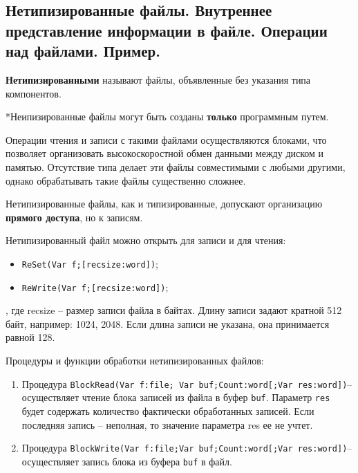
\newpage\subsection{Нетипизированные  файлы.  Внутреннее  представление  информации  в  файле.  Операции 
над файлами. Пример. }

\begin{myquote}
            
\end{myquote}

\noindent
{\bf{Нетипизированными}} называют файлы, объявленные без указания типа компонентов.

\noindent
*Неипизированные файлы могут быть созданы {\bf только} программным путем.

Операции чтения и записи с такими файлами осуществляются блоками, что позволяет организовать высокоскоростной обмен данными между диском и памятью. Отсутствие типа делает эти файлы совместимыми с любыми другими, однако обрабатывать такие файлы существенно сложнее.


Нетипизированные файлы, как и типизированные, допускают организацию {\bf{прямого доступа}}, но к записям.

\noindent
Нетипизированный файл можно открыть для записи и для чтения:
\begin{itemize}
         \item \texttt{ReSet(Var f;[recsize:word])};
         \item \texttt{ReWrite(Var f;[recsize:word])};
\end{itemize}

\noindent
, где recsize – размер записи файла в байтах. Длину записи задают кратной 512 байт, например:  1024, 2048. Если длина записи не указана, она принимается равной 128.

\noindent
Процедуры и функции обработки нетипизированных файлов:
\begin{enumerate}
    \item Процедура \texttt{BlockRead(Var f:file; Var buf;Count:word[;Var res:word])}– осуществляет чтение блока записей из файла в буфер \texttt{buf}. 
Параметр \texttt{res} будет содержать количество фактически обработанных записей. Если последняя запись – неполная, то значение параметра res ее не учтет. 
    \item Процедура \texttt{BlockWrite(Var f:file;Var buf;Count:word[;Var res:word])}– осуществляет запись блока из буфера \texttt{buf} в файл.
\end{enumerate}

